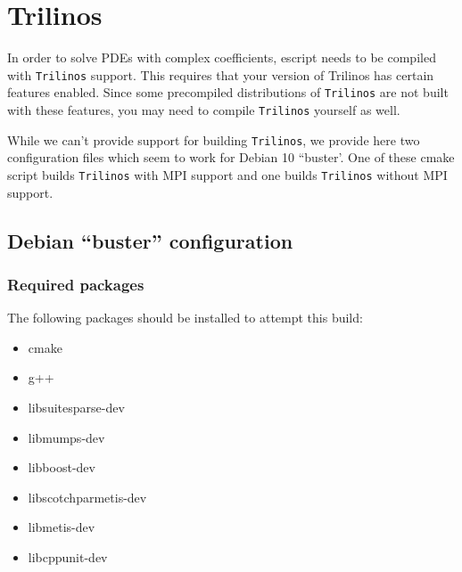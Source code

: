 \chapter{Trilinos}
\label{app:trilinos}

In order to solve PDEs with complex coefficients, escript needs to be compiled with \texttt{Trilinos} support.
This requires that your version of Trilinos has certain features enabled.
Since some precompiled distributions of \texttt{Trilinos} are not built with these features, you may 
need to compile \texttt{Trilinos} yourself as well.

While we can't provide support for building \texttt{Trilinos}, we provide here two configuration files which seem to work for 
Debian 10 ``buster'. One of these cmake script builds \texttt{Trilinos} with MPI support and one builds \texttt{Trilinos} without MPI support.

\section{Debian ``buster'' configuration}


\subsection{Required packages}

The following packages should be installed to attempt this build:
\begin{itemize}
\item[] cmake
\item[] g++
\item[] libsuitesparse-dev
\item[] libmumps-dev
\item[] libboost-dev
\item[] libscotchparmetis-dev
\item[] libmetis-dev
\item[] libcppunit-dev
\end{itemize}

